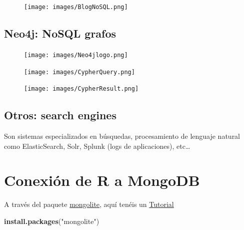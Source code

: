 \documentclass[]{book}
\newenvironment{Shaded}{\begin{snugshade}}{\end{snugshade}}
\newcommand{\KeywordTok}[1]{\textcolor[rgb]{0.13,0.29,0.53}{\textbf{#1}}}
\newcommand{\DataTypeTok}[1]{\textcolor[rgb]{0.13,0.29,0.53}{#1}}
\newcommand{\StringTok}[1]{\textcolor[rgb]{0.31,0.60,0.02}{#1}}
\newcommand{\CommentTok}[1]{\textcolor[rgb]{0.56,0.35,0.01}{\textit{#1}}}
\newcommand{\OperatorTok}[1]{\textcolor[rgb]{0.81,0.36,0.00}{\textbf{#1}}}
\newcommand{\NormalTok}[1]{#1}
\begin{document}
\begin{figure}
\centering
\texttt{[image: images/BlogNoSQL.png]}
\caption{}
\end{figure}

\subsection{Neo4j: NoSQL grafos}\label{neo4j-nosql-grafos}

\begin{figure}
\centering
\texttt{[image: images/Neo4jlogo.png]}
\caption{}
\end{figure}

\begin{figure}
\centering
\texttt{[image: images/CypherQuery.png]}
\caption{}
\end{figure}

\begin{figure}
\centering
\texttt{[image: images/CypherResult.png]}
\caption{}
\end{figure}

\subsection{Otros: search engines}\label{otros-search-engines}

Son sistemas especializados en búsquedas, procesamiento de lenguaje
natural como ElasticSearch, Solr, Splunk (logs de aplicaciones),
etc\ldots{}

\section{Conexión de R a MongoDB}\label{conexiuxf3n-de-r-a-mongodb}

A través del paquete
\href{https://cran.rstudio.com/web/packages/mongolite/mongolite.pdf}{mongolite},
aquí tenéis un
\href{https://datascienceplus.com/using-mongodb-with-r/}{Tutorial}

\begin{Shaded}
\begin{Highlighting}[]
\KeywordTok{install.packages}\NormalTok{(}\StringTok{"mongolite"}\NormalTok{)}
\end{Highlighting}
\end{Shaded}

\begin{Shaded}
\end{Shaded}
\end{document}
